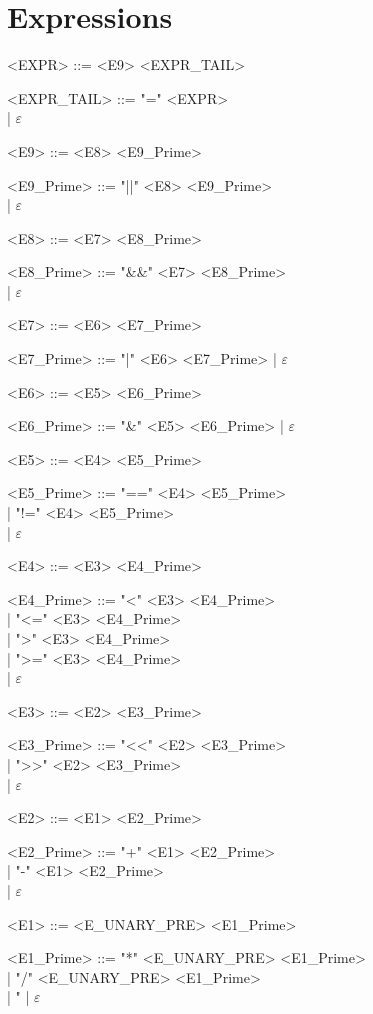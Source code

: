 \section{Expressions}
\begin{grammar}
<EXPR> ::= <E9> <EXPR\_TAIL>

<EXPR\_TAIL> ::= "=" <EXPR> \\
                | $\varepsilon$

<E9> ::= <E8> <E9\_Prime>

<E9\_Prime> ::= "||" <E8> <E9\_Prime> \\
              | $\varepsilon$

<E8> ::= <E7> <E8\_Prime>

<E8\_Prime> ::= "&&" <E7> <E8\_Prime> \\
              | $\varepsilon$

<E7> ::= <E6> <E7\_Prime>

<E7\_Prime> ::= "|" <E6> <E7\_Prime> | $\varepsilon$

<E6> ::= <E5> <E6\_Prime>

<E6\_Prime> ::= "&" <E5> <E6\_Prime> | $\varepsilon$

<E5> ::= <E4> <E5\_Prime>

<E5\_Prime> ::= "==" <E4> <E5\_Prime> \\
              | "!=" <E4> <E5\_Prime> \\
              | $\varepsilon$

<E4> ::= <E3> <E4\_Prime>

<E4\_Prime> ::= "<" <E3> <E4\_Prime> \\
              | "<=" <E3> <E4\_Prime> \\
              | ">" <E3> <E4\_Prime> \\
              | ">=" <E3> <E4\_Prime> \\
              | $\varepsilon$

<E3> ::= <E2> <E3\_Prime>

<E3\_Prime> ::= "<<" <E2> <E3\_Prime> \\
              | ">>" <E2> <E3\_Prime> \\
              | $\varepsilon$

<E2> ::= <E1> <E2\_Prime>

<E2\_Prime> ::= "+" <E1> <E2\_Prime> \\
              | "-" <E1> <E2\_Prime> \\
              | $\varepsilon$

<E1> ::= <E\_UNARY\_PRE> <E1\_Prime>

<E1\_Prime> ::= "*" <E\_UNARY\_PRE> <E1\_Prime> \\
              | "/" <E\_UNARY\_PRE> <E1\_Prime> \\
              | "%
              | $\varepsilon$
\end{grammar}

